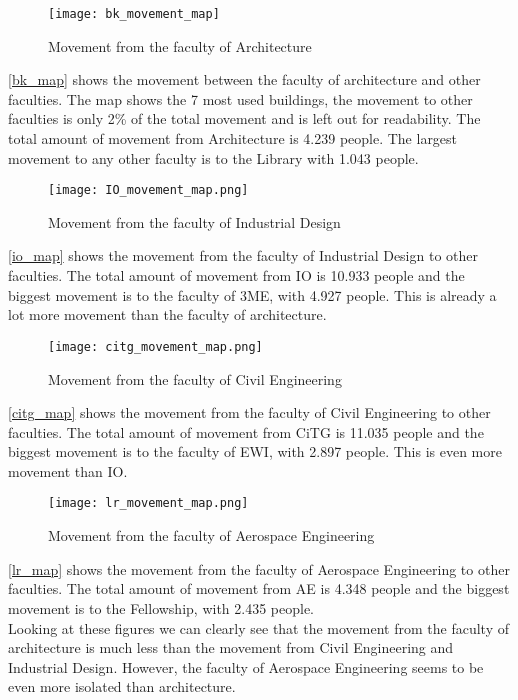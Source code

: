 \begin{figure}[H]
\centering
\texttt{[image: bk\_movement\_map]}
\captionsetup{justification=centering}
\caption{Movement from the faculty of Architecture}
\label{bk_map}
\end{figure} 

\autoref{bk_map} shows the movement between the faculty of architecture and other faculties. The map shows the 7 most used buildings, the movement to other faculties is only 2\% of the total movement and is left out for readability. The total amount of movement from Architecture is 4.239 people. The largest movement to any other faculty is to the Library with 1.043 people. \\

\begin{figure}[H]
\centering
\texttt{[image: IO\_movement\_map.png]}
\captionsetup{justification=centering}
\caption{Movement from the faculty of Industrial Design}
\label{io_map}
\end{figure} 

\autoref{io_map} shows the movement from the faculty of Industrial Design to other faculties. The total amount of movement from IO is 10.933 people and the biggest movement is to the faculty of 3ME, with 4.927 people. This is already a lot more movement than the faculty of architecture.\\

\begin{figure}[H]
\centering
\texttt{[image: citg\_movement\_map.png]}
\captionsetup{justification=centering}
\caption{Movement from the faculty of Civil Engineering}
\label{citg_map}
\end{figure} 

\autoref{citg_map} shows the movement from the faculty of Civil Engineering to other faculties. The total amount of movement from CiTG is 11.035 people and the biggest movement is to the faculty of EWI, with 2.897 people. This is even more movement than IO.\\

\begin{figure}[H]
\centering
\texttt{[image: lr\_movement\_map.png]}
\captionsetup{justification=centering}
\caption{Movement from the faculty of Aerospace Engineering}
\label{lr_map}
\end{figure} 

\autoref{lr_map} shows the movement from the faculty of Aerospace Engineering to other faculties. The total amount of movement from AE is 4.348 people and the biggest movement is to the Fellowship, with 2.435 people. \\
Looking at these figures we can clearly see that the movement from the faculty of architecture is much less than the movement from Civil Engineering and Industrial Design.  However, the faculty of Aerospace Engineering seems to be even more isolated than architecture. 

